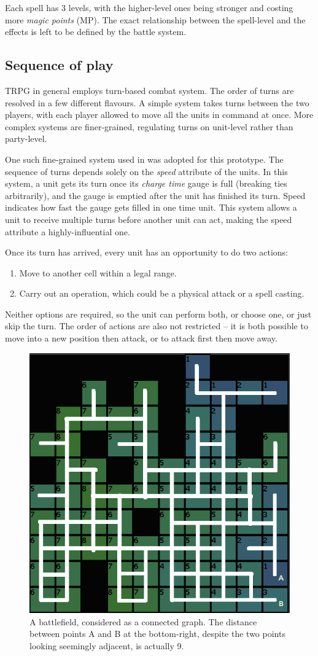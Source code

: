 Each spell has 3 levels, with the higher-level ones being stronger and costing more \textit{magic points} (MP). The exact relationship between the spell-level and the effects is left to be defined by the battle system.

\subsection{Sequence of play}
\label{sub:playsequence}

TRPG in general employs turn-based combat system. The order of turns are resolved in a few different flavours. A simple system takes turns between the two players, with each player allowed to move all the units in command at once. More complex systems are finer-grained, regulating turns on unit-level rather than party-level.

One such fine-grained system used in \cite{web-fftbmg} was adopted for this prototype. The sequence of turns depends solely on the \textit{speed} attribute of the units. In this system, a unit gets its turn once its \textit{charge time} gauge is full (breaking ties arbitrarily), and the gauge is emptied after the unit has finished its turn. Speed indicates how fast the gauge gets filled in one time unit. This system allows a unit to receive multiple turns before another unit can act, making the speed attribute a highly-influential one.

Once its turn has arrived, every unit has an opportunity to do two actions:
\begin{enumerate}
	\item Move to another cell within a legal range.
	\item Carry out an operation, which could be a physical attack or a spell casting. 
\end{enumerate}
Neither options are required, so the unit can perform both, or choose one, or just skip the turn. The order of actions are also not restricted -- it is both possible to move into a new position then attack, or to attack first then move away.

\begin{figure}
	\centering
	\includegraphics[width=.6\linewidth]{figures/connections}
	\caption{A battlefield, considered as a connected graph. The distance between points A and B at the bottom-right, despite the two points looking seemingly adjacent, is actually 9.}
	\label{fig:connected}
\end{figure}


